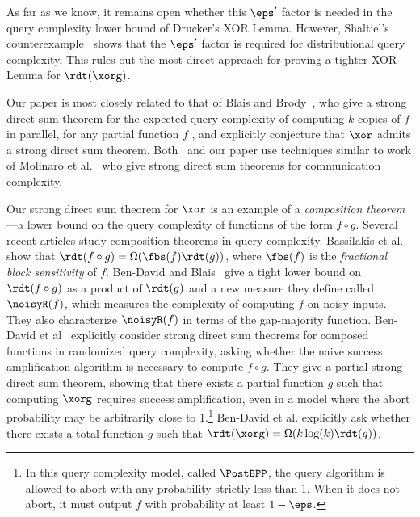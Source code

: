 \documentclass[11pt]{article}
\numberwithin{equation}{section}
\theoremstyle{definition}
\theoremstyle{plain}
\begin{document}
As far as we know, it remains open whether this $\eps'$ factor is
needed in the query complexity lower bound of Drucker's XOR Lemma.
However, Shaltiel's counterexample~\cite{Shaltiel03} shows that the
$\eps'$ factor is required for distributional query complexity.  This
rules out the most direct approach for proving a tighter XOR Lemma for
$\rdt(\xorg)$.

Our %
paper %
is most closely related to that of Blais and
Brody~\cite{BlaisB19}, who give a strong direct sum theorem for
the expected query complexity of computing $k$ copies of $f$ in parallel, for any partial function $f$%
%
%
%
%
%
, and explicitly
conjecture that $\xor$ admits a strong direct sum theorem.
Both~\cite{BlaisB19} and our %
paper %
use techniques similar to work of
Molinaro et al.~\cite{MolinaroWY13, MolinaroWY15} who give strong
direct sum theorems for communication complexity.

Our strong direct sum theorem for $\xor$ is an example of a \emph{composition
  theorem}---a lower bound on the query complexity of functions of the
form $f\circ g$.  Several %
recent articles study %
composition theorems in query complexity.  Bassilakis et
al.~\cite{BassilakisDGHMT20} show that
$\rdt(f\circ g) = \Omega(\fbs(f)\rdt(g))$, where $\fbs(f)$ is the
\emph{fractional block sensitivity} of $f$.  Ben-David and
Blais~\cite{BenDavidB20a, BenDavidB20b} give a tight lower bound on
$\rdt(f\circ g)$ as a product of $\rdt(g)$ and a new measure they
define called \emph{$\noisyR(f)$}, which measures the complexity of
computing $f$ on noisy inputs.  They also characterize $\noisyR(f)$ in
terms of the gap-majority function.  Ben-David et
al~\cite{BenDavidGKW20} explicitly consider strong direct sum theorems
for composed functions in randomized query complexity, asking whether
the naive success amplification algorithm is necessary to compute
$f\circ g$.  They give a partial strong direct sum theorem, showing
that there exists a partial function $g$ such that computing $\xorg$
requires success amplification, even in a model where the abort
probability may be arbitrarily close to 1.\footnote{In this query
  complexity model, called $\PostBPP$, the query algorithm is allowed
  to abort with any probability strictly less than 1.  When it %
  does not %
  abort, it must output $f$ with probability at least $1-\eps$.}
Ben-David et al. explicitly ask whether there exists a total function
$g$ such that $\rdt(\xorg) = \Omega(k\log(k)\rdt(g))$.

%
\end{document}
